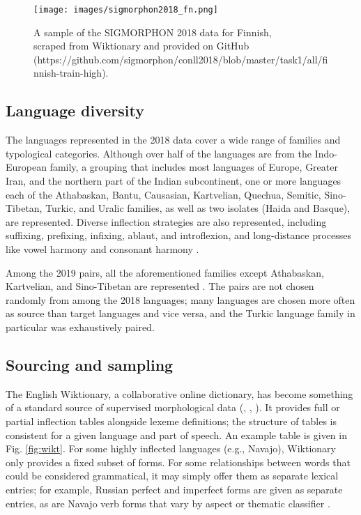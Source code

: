 \begin{figure}[ht]
\texttt{[image: images/sigmorphon2018\_fn.png]}
\centering
\caption{A sample of the SIGMORPHON 2018 data for Finnish, \\
scraped from Wiktionary and provided on GitHub\\ (https://github.com/sigmorphon/conll2018/blob/master/task1/all/finnish-train-high).}
\label{fig:fintrip}
\end{figure}

\subsection{Language diversity}

The languages represented in the 2018 data cover a wide range of families and typological categories. Although over half of the languages are from the Indo-European family, a grouping that includes most languages of Europe, Greater Iran, and the northern part of the Indian subcontinent, one or more languages each of the Athabaskan, Bantu, Causasian, Kartvelian, Quechua, Semitic, Sino-Tibetan, Turkic, and Uralic families, as well as two isolates (Haida and Basque), are represented. Diverse inflection strategies are also represented, including suffixing, prefixing, infixing, ablaut, and introflexion, and long-distance processes like vowel harmony and consonant harmony \parencite{Cotterell2018b}. 

Among the 2019 pairs, all the aforementioned families except Athabaskan, Kartvelian, and Sino-Tibetan are represented \parencite{McCarthy2019}. The pairs are not chosen randomly from among the 2018 languages; many languages are chosen more often as source than target languages and vice versa, and the Turkic language family in particular was exhaustively paired. 

\subsection{Sourcing and sampling}

The English Wiktionary, a collaborative online dictionary, has become something of a standard source of supervised morphological data (\cite{Cotterell2016}, \cite{Cotterell2017a}, \cite{Cotterell2018b}). It provides full or partial inflection tables alongside lexeme definitions; the structure of tables is consistent for a given language and part of speech. An example table is given in Fig. \ref{fig:wikt}. For some highly inflected languages (e.g., Navajo), Wiktionary only provides a fixed subset of forms. For some relationships between words that could be considered grammatical, it may simply offer them as separate lexical entries; for example, Russian perfect and imperfect forms are given as separate entries, as are Navajo verb forms that vary by aspect or thematic classifier \parencite{Wiktionary}.  

